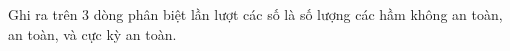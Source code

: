 Ghi ra trên 3 dòng phân biệt lần lượt các số là số lượng các hầm không an toàn, an toàn, và cực kỳ an toàn.  

\